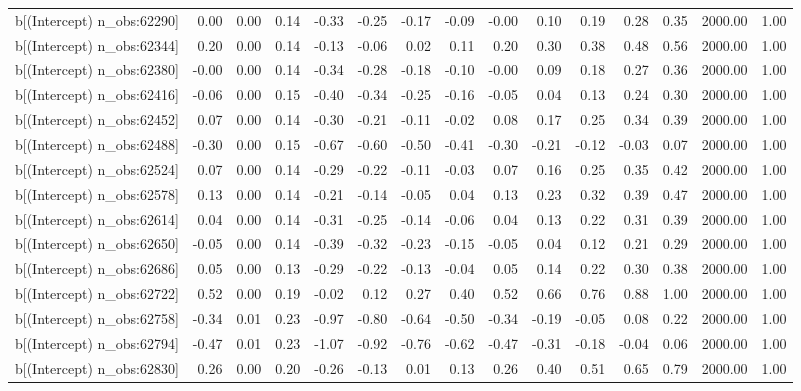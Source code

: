 \begin{table}[ht]
\begin{tabular}{rrrrrrrrrrrrrrr}
  b[(Intercept) n\_obs:62290] & 0.00 & 0.00 & 0.14 & -0.33 & -0.25 & -0.17 & -0.09 & -0.00 & 0.10 & 0.19 & 0.28 & 0.35 & 2000.00 & 1.00 \\ 
  b[(Intercept) n\_obs:62344] & 0.20 & 0.00 & 0.14 & -0.13 & -0.06 & 0.02 & 0.11 & 0.20 & 0.30 & 0.38 & 0.48 & 0.56 & 2000.00 & 1.00 \\ 
  b[(Intercept) n\_obs:62380] & -0.00 & 0.00 & 0.14 & -0.34 & -0.28 & -0.18 & -0.10 & -0.00 & 0.09 & 0.18 & 0.27 & 0.36 & 2000.00 & 1.00 \\ 
  b[(Intercept) n\_obs:62416] & -0.06 & 0.00 & 0.15 & -0.40 & -0.34 & -0.25 & -0.16 & -0.05 & 0.04 & 0.13 & 0.24 & 0.30 & 2000.00 & 1.00 \\ 
  b[(Intercept) n\_obs:62452] & 0.07 & 0.00 & 0.14 & -0.30 & -0.21 & -0.11 & -0.02 & 0.08 & 0.17 & 0.25 & 0.34 & 0.39 & 2000.00 & 1.00 \\ 
  b[(Intercept) n\_obs:62488] & -0.30 & 0.00 & 0.15 & -0.67 & -0.60 & -0.50 & -0.41 & -0.30 & -0.21 & -0.12 & -0.03 & 0.07 & 2000.00 & 1.00 \\ 
  b[(Intercept) n\_obs:62524] & 0.07 & 0.00 & 0.14 & -0.29 & -0.22 & -0.11 & -0.03 & 0.07 & 0.16 & 0.25 & 0.35 & 0.42 & 2000.00 & 1.00 \\ 
  b[(Intercept) n\_obs:62578] & 0.13 & 0.00 & 0.14 & -0.21 & -0.14 & -0.05 & 0.04 & 0.13 & 0.23 & 0.32 & 0.39 & 0.47 & 2000.00 & 1.00 \\ 
  b[(Intercept) n\_obs:62614] & 0.04 & 0.00 & 0.14 & -0.31 & -0.25 & -0.14 & -0.06 & 0.04 & 0.13 & 0.22 & 0.31 & 0.39 & 2000.00 & 1.00 \\ 
  b[(Intercept) n\_obs:62650] & -0.05 & 0.00 & 0.14 & -0.39 & -0.32 & -0.23 & -0.15 & -0.05 & 0.04 & 0.12 & 0.21 & 0.29 & 2000.00 & 1.00 \\ 
  b[(Intercept) n\_obs:62686] & 0.05 & 0.00 & 0.13 & -0.29 & -0.22 & -0.13 & -0.04 & 0.05 & 0.14 & 0.22 & 0.30 & 0.38 & 2000.00 & 1.00 \\ 
  b[(Intercept) n\_obs:62722] & 0.52 & 0.00 & 0.19 & -0.02 & 0.12 & 0.27 & 0.40 & 0.52 & 0.66 & 0.76 & 0.88 & 1.00 & 2000.00 & 1.00 \\ 
  b[(Intercept) n\_obs:62758] & -0.34 & 0.01 & 0.23 & -0.97 & -0.80 & -0.64 & -0.50 & -0.34 & -0.19 & -0.05 & 0.08 & 0.22 & 2000.00 & 1.00 \\ 
  b[(Intercept) n\_obs:62794] & -0.47 & 0.01 & 0.23 & -1.07 & -0.92 & -0.76 & -0.62 & -0.47 & -0.31 & -0.18 & -0.04 & 0.06 & 2000.00 & 1.00 \\ 
  b[(Intercept) n\_obs:62830] & 0.26 & 0.00 & 0.20 & -0.26 & -0.13 & 0.01 & 0.13 & 0.26 & 0.40 & 0.51 & 0.65 & 0.79 & 2000.00 & 1.00 \\ 

\end{tabular}
\end{table}
